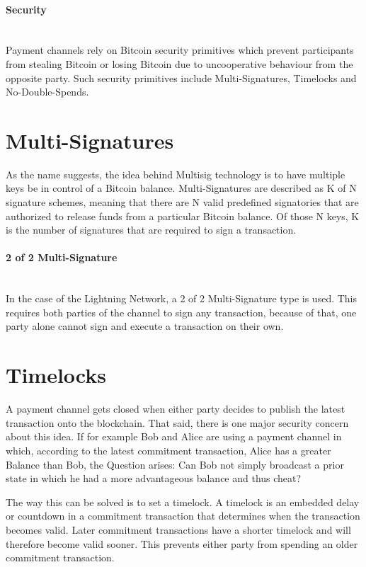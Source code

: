 \documentclass[a4paper, 12pt]{report}
\begin{document}
\paragraph{Security} \hspace{0pt} \\
Payment channels rely on Bitcoin security primitives which prevent participants from stealing Bitcoin or losing Bitcoin due to uncooperative behaviour from the opposite party. Such security primitives include Multi-Signatures, Timelocks and No-Double-Spends.

\section{Multi-Signatures}
\par As the name suggests, the idea behind Multisig technology is to have multiple keys be in control of a Bitcoin balance. Multi-Signatures are described as K of N signature schemes, meaning that there are N valid predefined signatories that are authorized to release funds from a particular Bitcoin balance. Of those N keys, K is the number of signatures that are required to sign a transaction.

\paragraph{2 of 2 Multi-Signature} \hspace{0pt} \\
In the case of the Lightning Network, a 2 of 2 Multi-Signature type is used. This requires both parties of the channel to sign any transaction, because of that, one party alone cannot sign and execute a transaction on their own.

\section{Timelocks}
\par A payment channel gets closed when either party decides to publish the latest transaction onto the blockchain. That said, there is one major security concern about this idea. If for example Bob and Alice are using a payment channel in which, according to the latest commitment transaction, Alice has a greater Balance than Bob, the Question arises: Can Bob not simply broadcast a prior state in which he had a more advantageous balance and thus cheat?

\par The way this can be solved is to set a timelock. A timelock is an embedded delay or countdown in a commitment transaction that determines when the transaction becomes valid. Later commitment transactions have a shorter timelock and will therefore become valid sooner. This prevents either party from spending an older commitment transaction.
\end{document}
